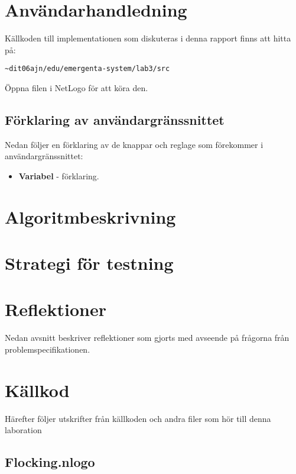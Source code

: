 \documentclass[titlepage, a4paper, 12pt]{article}
\begin{document}
\section{Användarhandledning}
Källkoden till implementationen som diskuteras i denna rapport finns
att hitta på:

\verb!~dit06ajn/edu/emergenta-system/lab3/src!

Öppna filen i NetLogo för att köra den.

\subsection{Förklaring av användargränssnittet}
Nedan följer en förklaring av de knappar och reglage som förekommer i
användargränssnittet:

\begin{itemize}
\item \textbf{Variabel} - förklaring.
\end{itemize}

\section{Algoritmbeskrivning}

\section{Strategi för testning}

\section{Reflektioner}\label{sec:reflektioner}

Nedan avsnitt beskriver reflektioner som gjorts med avseende på
frågorna från problemspecifikationen.

    
    
    

\newpage
\appendix
{}
\section{Källkod}\label{sec:kallkod}
Härefter följer utskrifter från källkoden och andra filer som hör till
denna laboration

\subsection{Flocking.nlogo}\label{app:Flocking.nlogo}
\begin{footnotesize}
  
\end{footnotesize}
\end{document}
